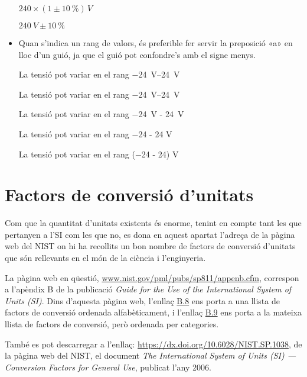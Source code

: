 \begin{itemize}
\textcolor{Green}\faCheckSquare{} $240 \times (1 \pm \qty{10}{\percent})\unit{\,V}$

\textcolor{Blue}\faExclamationTriangle{}  $\qty{240}{V} \pm \qty{10}{\percent}$


\item Quan s'indica un rang de valors, és preferible fer servir la preposició «a» en lloc d'un guió, ja que el guió pot confondre's amb el signe menys.

\textcolor{Green}\faCheckSquare{} La tensió pot variar en el rang \qtyrange{-24}{24}{V}

\textcolor{Green}\faCheckSquare{} La tensió pot variar en el rang \qtyrange[range-units = bracket]{-24}{24}{V}

\textcolor{Blue}\faExclamationTriangle{}  La tensió pot variar en el rang \qty{-24}{V} - \qty{24}{V}

\textcolor{Blue}\faExclamationTriangle{} La tensió pot variar en el rang \num{-24} - 24 V 

\textcolor{Blue}\faExclamationTriangle{} La tensió pot variar en el rang (\num{-24} - 24) V 

\end{itemize}


\section{Factors de conversió d'unitats}\label{sec:SI-fact-conv}
Com que la quantitat d'unitats existents és enorme, tenint en compte tant les que pertanyen a l'SI com les que no, es dona en aquest apartat l'adreça de la pàgina web del NIST on hi ha recollits un bon nombre de factors de conversió d'unitats que són rellevants en el món de la ciència i l'enginyeria.

La pàgina web en  qüestió, \href{http://www.nist.gov/pml/pubs/sp811/appenb.cfm}{www.nist.gov/pml/pubs/sp811/appenb.cfm}, correspon a l'apèndix B de la publicació \textit{Guide for the Use of the International System of Units (SI)}.
Dins d'aquesta pàgina web, l'enllaç \href{http://www.nist.gov/pml/pubs/sp811/appenb8.cfm}{B.8} ens porta a una llista de factors de conversió ordenada alfabèticament, i l'enllaç  \href{http://www.nist.gov/pml/pubs/sp811/appenb9.cfm}{B.9} ens porta a la mateixa llista de factors de conversió, però ordenada per categories.

També es pot descarregar a l'enllaç: \href{https://dx.doi.org/10.6028/NIST.SP.1038}{https://dx.doi.org/10.6028/NIST.SP.1038}, de la pàgina web del NIST, el document \textit{The International System of Units (SI) --- Conversion Factors
for General Use}, publicat l'any 2006.
